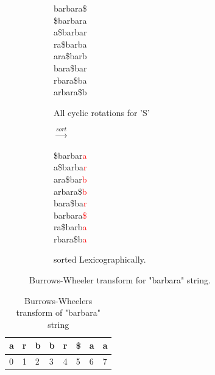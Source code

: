 \documentclass[11pt,a4paper]{report}
\begin{document}
\begin{figure}[H]
\centering
\begin{subfigure}{.5\textwidth}
  \centering
barbara\$\\
\$barbara\\
a\$barbar\\
ra\$barba\\
ara\$barb\\
bara\$bar\\
rbara\$ba\\
arbara\$b
  \caption{All cyclic rotations for 'S'}
  \label{fig:barbaraBWT1}
\end{subfigure}%
\begin{subfigure}{.1\textwidth}
  \centering
$\xrightarrow{sort}$
\label{fig:sub1}
\end{subfigure}%
\begin{subfigure}{.5\textwidth}
  \centering
\$barbar\textcolor{red}{a}\\
a\$barba\textcolor{red}{r}\\
ara\$bar\textcolor{red}{b}\\
arbara\$\textcolor{red}{b}\\
bara\$ba\textcolor{red}{r}\\
barbara\textcolor{red}{\$}\\
ra\$barb\textcolor{red}{a}\\
rbara\$b\textcolor{red}{a}
 \caption{sorted  Lexicographically.}
  \label{fig:Burrows-Wheeler transform}
\end{subfigure}
\caption{Burrows-Wheeler transform for "barbara" string.}
\label{barbaraBWT}
\end{figure}








\begin{table}[h]
 \centering
  \begin{tabular}{ | p{0.5cm} | p{0.5cm} | p{0.5cm} |p{0.5cm} 
  |p{0.5cm} |p{0.5cm} |p{0.5cm} |p{0.5cm} |}
    \hline
  \textbf{a} & \textbf{r} &\textbf{b}  &\textbf{b} &\textbf{r} 
  &\textbf{\$} &\textbf{a} &\textbf{a}\\ \hline
       0 & 1 &2&3&4&5&6&7 \\ \hline
      
   \end{tabular}
\caption{Burrows-Wheelers transform of "barbara" string}
\label{BWT-barbara}
\end{table}
\end{document}
